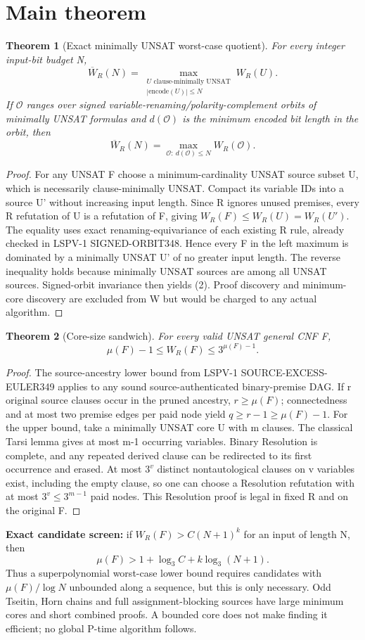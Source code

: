 \documentclass[11pt]{article}
\newtheorem{theorem}{Theorem}
\begin{document}
\section*{Main theorem}
\begin{theorem}[Exact minimally UNSAT worst-case quotient]
For every integer input-bit budget N,
\[
\boxed{\overline W_R(N)=
\max_{\substack{U\text{ clause-minimally UNSAT}\\|\mathrm{encode}(U)|\le N}}W_R(U).}
\tag{1}
\]
If $\mathcal O$ ranges over signed variable-renaming/polarity-complement orbits of minimally UNSAT formulas and $d(\mathcal O)$ is the minimum encoded bit length in the orbit, then
\[
\boxed{\overline W_R(N)=\max_{\mathcal O:\ d(\mathcal O)\le N}W_R(\mathcal O).}
\tag{2}
\]
\end{theorem}
\begin{proof}
For any UNSAT F choose a minimum-cardinality UNSAT source subset U, which is necessarily clause-minimally UNSAT. Compact its variable IDs into a source U' without increasing input length. Since R ignores unused premises, every R refutation of U is a refutation of F, giving $W_R(F)\le W_R(U)=W_R(U')$. The equality uses exact renaming-equivariance of each existing R rule, already checked in LSPV-1 SIGNED-ORBIT348. Hence every F in the left maximum is dominated by a minimally UNSAT U' of no greater input length. The reverse inequality holds because minimally UNSAT sources are among all UNSAT sources. Signed-orbit invariance then yields (2). Proof discovery and minimum-core discovery are excluded from W but would be charged to any actual algorithm.
\end{proof}
\begin{theorem}[Core-size sandwich]
For every valid UNSAT general CNF F,
\[
\boxed{\mu(F)-1\le W_R(F)\le 3^{\mu(F)-1}.}\tag{3}
\]
\end{theorem}
\begin{proof}
The source-ancestry lower bound from LSPV-1 SOURCE-EXCESS-EULER349 applies to any sound source-authenticated binary-premise DAG. If r original source clauses occur in the pruned ancestry, $r\ge\mu(F)$; connectedness and at most two premise edges per paid node yield $q\ge r-1\ge\mu(F)-1$. For the upper bound, take a minimally UNSAT core U with m clauses. The classical Tarsi lemma gives at most m-1 occurring variables. Binary Resolution is complete, and any repeated derived clause can be redirected to its first occurrence and erased. At most $3^v$ distinct nontautological clauses on v variables exist, including the empty clause, so one can choose a Resolution refutation with at most $3^v\le 3^{m-1}$ paid nodes. This Resolution proof is legal in fixed R and on the original F.
\end{proof}
\noindent \textbf{Exact candidate screen:} if $W_R(F)>C(N+1)^k$ for an input of length N, then
\[
\mu(F)>1+\log_3C+k\log_3(N+1).
\]
Thus a superpolynomial worst-case lower bound requires candidates with $\mu(F)/\log N$ unbounded along a sequence, but this is only necessary. Odd Tseitin, Horn chains and full assignment-blocking sources have large minimum cores and short combined proofs. A bounded core does not make finding it efficient; no global P-time algorithm follows.
\end{document}

